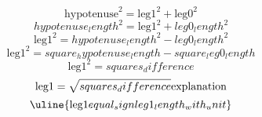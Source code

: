 \[\text{{{hypotenuse}}}^{{2}}=\text{{{leg1}}}^{{2}}+\text{{{leg0}}}^{{2}}\]
\[{hypotenuse_length}^{{2}}=\text{{{leg1}}}^{{2}}+{leg0_length}^{{2}}\]
\[\text{{{leg1}}}^{{2}}={hypotenuse_length}^{{2}}-{leg0_length}^{{2}}\]
\[\text{{{leg1}}}^{{2}}={square_hypotenuse_length}-{square_leg0_length}\]
\[\text{{{leg1}}}^{{2}}={squares_difference}\]
\[\text{{{leg1}}}=\sqrt{{\mathstrut {squares_difference}}}\text{{{explanation}}}\]
\[\uline{{\text{{{leg1}}}{equal_sign}{leg1_length_with_unit}}}\]